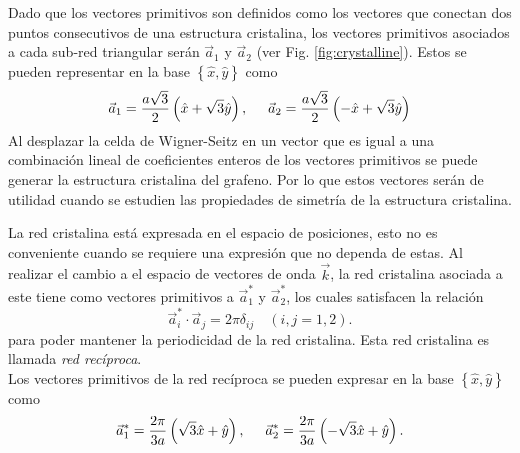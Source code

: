 Dado que los vectores primitivos son definidos como los vectores que conectan dos puntos consecutivos de una estructura cristalina, los vectores primitivos asociados a cada sub-red triangular serán $\vec{a}_1$ y $\vec{a}_2$ (ver Fig. \ref{fig:crystalline}). Estos se pueden representar en la base $\left\{\hat{x},\hat{y}\right\}$ como
\begin{equation}
	\vec{a}_1 = \frac{a\sqrt{3}}{2}\left(\hat{x}+\sqrt{3} \hat{y}\right),\hspace{0.5cm}\vec{a}_2= \frac{a \sqrt{3}}{2}\left(-\hat{x}+\sqrt{3} \hat{y}\right)\label{eq:primitive}
\end{equation}
Al desplazar la celda de Wigner-Seitz en un vector que es igual a una combinación lineal de coeficientes enteros de los vectores primitivos se puede generar la estructura cristalina del grafeno. Por lo que estos vectores serán de utilidad cuando se estudien las propiedades de simetría de la estructura cristalina.\par
La red cristalina está expresada en el espacio de posiciones, esto no es conveniente cuando se requiere una expresión que no dependa de estas. Al realizar el cambio a el espacio de vectores de onda $\vec{k}$, la red cristalina asociada a este tiene como vectores primitivos a $\vec{a}_1^{\ast}$ y $\vec{a}_2^{\ast}$, los cuales satisfacen la relación 
\begin{equation}
	\vec{a}^{\ast}_i\cdot \vec{a}_j = 2\pi\delta_{ij} \quad \left(i,j = 1,2\right).
\end{equation}
para poder mantener la periodicidad de la red cristalina. Esta red cristalina es llamada \emph{red recíproca}.\\ Los vectores primitivos de la red recíproca se pueden expresar en la base $\left\{\hat{x}, \hat{y}\right\}$ como
\begin{equation}
	\vec{a}^{\ast}_1 = \frac{2\pi}{3a}\left(\sqrt{3}\hat{x}+\hat{y}\right),\hspace{0.5cm}\vec{a}^{\ast}_2= \frac{2\pi}{3a}\left(-\sqrt{3}\hat{x}+\hat{y}\right).\label{eq:recipprimitive}
\end{equation}
